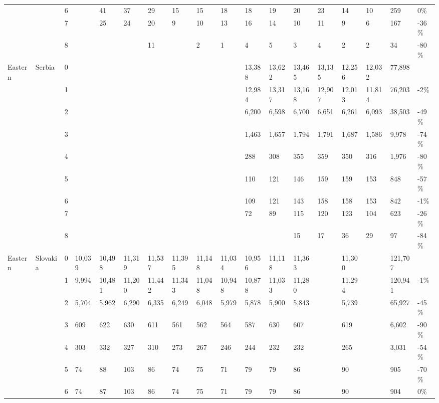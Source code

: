 \begin{longtable}{llllllllllllllllll}
   &  & 6 &  & 41 & 37 & 29 & 15 & 15 & 18 & 18 & 19 & 20 & 23 & 14 & 10 & 259 & 0\% \\ 
   &  & 7 &  & 25 & 24 & 20 & 9 & 10 & 13 & 16 & 14 & 10 & 11 & 9 & 6 & 167 & -36\% \\ 
   &  & 8 &  &  &  & 11 &  & 2 & 1 & 4 & 5 & 3 & 4 & 2 & 2 & 34 & -80\% \\ 
  Eastern & Serbia & 0 &  &  &  &  &  &  &  & 13,388 & 13,622 & 13,465 & 13,135 & 12,256 & 12,032 & 77,898 &  \\ 
   &  & 1 &  &  &  &  &  &  &  & 12,984 & 13,317 & 13,168 & 12,907 & 12,013 & 11,814 & 76,203 & -2\% \\ 
   &  & 2 &  &  &  &  &  &  &  & 6,200 & 6,598 & 6,700 & 6,651 & 6,261 & 6,093 & 38,503 & -49\% \\ 
   &  & 3 &  &  &  &  &  &  &  & 1,463 & 1,657 & 1,794 & 1,791 & 1,687 & 1,586 & 9,978 & -74\% \\ 
   &  & 4 &  &  &  &  &  &  &  & 288 & 308 & 355 & 359 & 350 & 316 & 1,976 & -80\% \\ 
   &  & 5 &  &  &  &  &  &  &  & 110 & 121 & 146 & 159 & 159 & 153 & 848 & -57\% \\ 
   &  & 6 &  &  &  &  &  &  &  & 109 & 121 & 143 & 158 & 158 & 153 & 842 & -1\% \\ 
   &  & 7 &  &  &  &  &  &  &  & 72 & 89 & 115 & 120 & 123 & 104 & 623 & -26\% \\ 
   &  & 8 &  &  &  &  &  &  &  &  &  & 15 & 17 & 36 & 29 & 97 & -84\% \\ 
  Eastern & Slovakia & 0 & 10,039 & 10,498 & 11,319 & 11,537 & 11,395 & 11,148 & 11,034 & 10,956 & 11,118 & 11,363 &  & 11,300 &  & 121,707 &  \\ 
   &  & 1 & 9,994 & 10,481 & 11,200 & 11,442 & 11,343 & 11,048 & 10,948 & 10,878 & 11,033 & 11,280 &  & 11,294 &  & 120,941 & -1\% \\ 
   &  & 2 & 5,704 & 5,962 & 6,290 & 6,335 & 6,249 & 6,048 & 5,979 & 5,878 & 5,900 & 5,843 &  & 5,739 &  & 65,927 & -45\% \\ 
   &  & 3 & 609 & 622 & 630 & 611 & 561 & 562 & 564 & 587 & 630 & 607 &  & 619 &  & 6,602 & -90\% \\ 
   &  & 4 & 303 & 332 & 327 & 310 & 273 & 267 & 246 & 244 & 232 & 232 &  & 265 &  & 3,031 & -54\% \\ 
   &  & 5 & 74 & 88 & 103 & 86 & 74 & 75 & 71 & 79 & 79 & 86 &  & 90 &  & 905 & -70\% \\ 
   &  & 6 & 74 & 87 & 103 & 86 & 74 & 75 & 71 & 79 & 79 & 86 &  & 90 &  & 904 & 0\% \\ 

\end{longtable}
